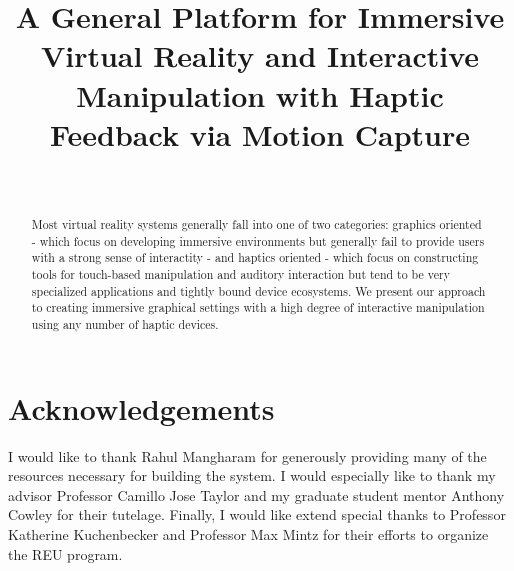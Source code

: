 \documentclass{IEEEtran}
\title{A General Platform for Immersive Virtual Reality and Interactive Manipulation with Haptic Feedback via Motion Capture}
\author{
    \IEEEauthorblockN{Armon Shariati} \\
\IEEEauthorblockA{Lehigh University \\ University of Pennsylvania}
}
\begin{document}
\setlength{\pdfpagewidth}{8.5in}
\setlength{\pdfpageheight}{11 in}
\maketitle

\begin{abstract}
    Most virtual reality systems generally fall into one of two categories:
    graphics oriented - which focus on developing immersive environments but
    generally fail to provide users with a strong sense of interactity - and
    haptics oriented - which focus on constructing tools for touch-based
    manipulation and auditory interaction but tend to be very specialized
    applications and tightly bound device ecosystems. We present our approach
    to creating immersive graphical settings with a high degree of interactive
    manipulation using any number of haptic devices.
\end{abstract}







\section{Acknowledgements}
I would like to thank Rahul Mangharam for generously providing many of the
resources necessary for building the system. I would especially like to thank
my advisor Professor Camillo Jose Taylor and my graduate student mentor
Anthony Cowley for their tutelage. Finally, I would like extend special thanks
to Professor Katherine Kuchenbecker and Professor Max Mintz for their efforts
to organize the REU program.



\end{document}
